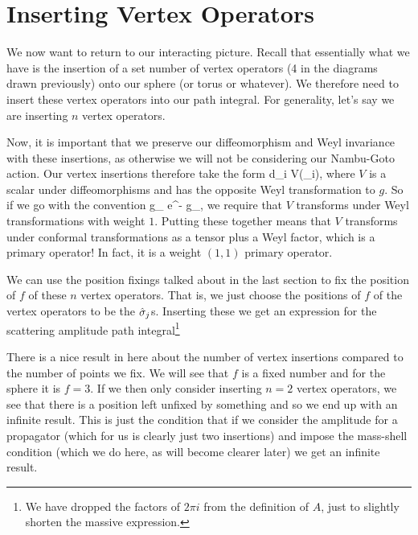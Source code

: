 \section{Inserting Vertex Operators}

We now want to return to our interacting picture. Recall that essentially what we have is the insertion of a set number of vertex operators (4 in the diagrams drawn previously) onto our sphere (or torus or whatever). We therefore need to insert these vertex operators into our path integral. For generality, let's say we are inserting $n$ vertex operators.

Now, it is important that we preserve our diffeomorphism and Weyl invariance with these insertions, as otherwise we will not be considering our Nambu-Goto action. Our vertex insertions therefore take the form 
\bse 
    \int d\sig_i  V(\sig_i),
\ese 
where $V$ is a scalar under diffeomorphisms and has the opposite Weyl transformation to $g$. So if we go with the convention 
\bse 
    g_{\a\beta} \to e^{-\phi} g_{\a\beta},
\ese 
we require that $V$ transforms under Weyl transformations with weight $1$. Putting these together means that $V$ transforms under conformal transformations as a tensor plus a Weyl factor, which is a primary operator! In fact, it is a weight $(1,1)$ primary operator.

We can use the position fixings talked about in the last section to fix the position of $f$ of these $n$ vertex operators. That is, we just choose the positions of $f$ of the vertex operators to be the $\hat{\sigma}_j$s. Inserting these we get an expression for the scattering amplitude path integral\footnote{We have dropped the factors of $2\pi i$ from the definition of $A$, just to slightly shorten the massive expression.}


\br 
There is a nice result in here about the number of vertex insertions compared to the number of points we fix. We will see that $f$ is a fixed number and for the sphere it is $f=3$. If we then only consider inserting $n=2$ vertex operators, we see that there is a position left unfixed by something and so we end up with an infinite result. This is just the condition that if we consider the amplitude for a propagator (which for us is clearly just two insertions) and impose the mass-shell condition (which we do here, as will become clearer later) we get an infinite result. 
\er 


